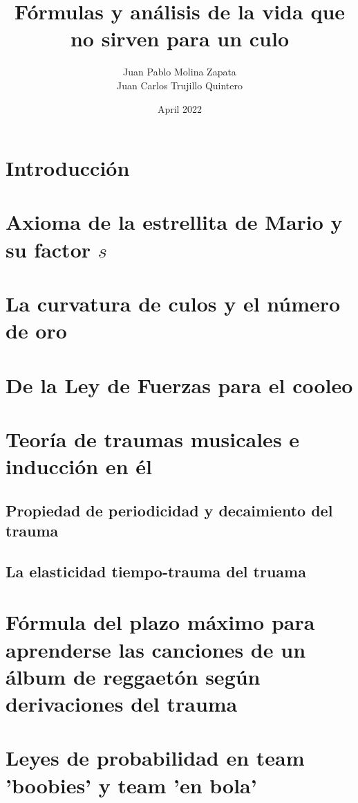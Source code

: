 \documentclass{book}
\title{Fórmulas y análisis de la vida que no sirven para un culo}
\author{Juan Pablo Molina Zapata \\ Juan Carlos Trujillo Quintero}
\date{April 2022}
\begin{document}
\maketitle

\tableofcontents

\section{Introducción}

\section{Axioma de la estrellita de Mario y su factor $s$}
\section{La curvatura de culos y el número de oro}
\section{De la Ley de Fuerzas para el cooleo}
\section{Teoría de traumas musicales e inducción en él}
\subsection{Propiedad de periodicidad y decaimiento del trauma}
\subsection{La elasticidad tiempo-trauma del truama}
\section{Fórmula del plazo máximo para aprenderse las canciones de un álbum de reggaetón según derivaciones del trauma}
\section{Leyes de probabilidad en team 'boobies' y team 'en bola'}
\end{document}
